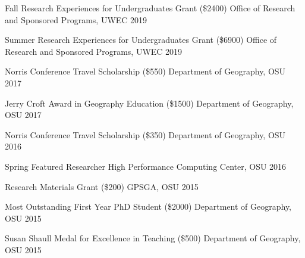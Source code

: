 
\begin{cvhonors}
  \cvhonor
  {Fall Research Experiences for Undergraduates Grant (\$2400)}
  {}
  {Office of Research and Sponsored Programs, UWEC}
  {2019}


  \cvhonor
  {Summer Research Experiences for Undergraduates Grant (\$6900)}
  {}
  {Office of Research and Sponsored Programs, UWEC}
  {2019}

  \cvhonor
    {Norris Conference Travel Scholarship (\$550)} %
    {} %
    {Department of Geography, OSU} %
    {2017} %

  \cvhonor
    {Jerry Croft Award in Geography Education (\$1500)} %
    {} %
    {Department of Geography, OSU} %
    {2017} %

  \cvhonor
    {Norris Conference Travel Scholarship (\$350)} %
    {} %
    {Department of Geography, OSU} %
    {2016} %

  \cvhonor
    {Spring Featured Researcher}%
    {} %
    {High Performance Computing Center, OSU} %
    {2016} %

  \cvhonor
    {Research Materials Grant (\$200)}%
    {} %
    {GPSGA, OSU} %
    {2015} %

  \cvhonor
    {Most Outstanding First Year PhD Student (\$2000)}%
    {} %
    {Department of Geography, OSU} %
    {2015} %

  \cvhonor
    {Susan Shaull Medal for Excellence in Teaching (\$500)}%
    {} %
    {Department of Geography, OSU} %
    {2015} %


\end{cvhonors}

